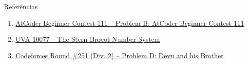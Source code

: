 \begin{frame}[fragile]{Referências}

    \begin{enumerate}
        \item \href{https://atcoder.jp/contests/abc111/tasks/abc111_b}{AtCoder Beginner
            Contest 111 -- Problem B: AtCoder Beginner Contest 111}

        \item \href{https://onlinejudge.org/index.php?option=com_onlinejudge&Itemid=8&page=show_problem&problem=1018}{UVA 10077 -- The Stern-Brocot Number System}

        \item \href{https://codeforces.com/problemset/problem/439/D}{Codeforces Round \#251 (Div. 2) -- Problem D: Devu and his Brother}
    \end{enumerate}

\end{frame}
